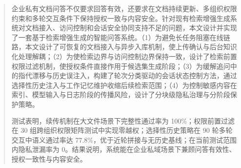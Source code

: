 

\begin{abstract}
  企业私有文档问答不仅要求回答有效，还要求在文档持续更新、多组织权限约束和多轮交互条件下保持授权一致与内容安全。针对现有检索增强生成系统对文档接入、访问控制和会话安全协同支持不足的问题，本文设计并实现了一套基于检索增强生成的智能问答系统。（1）为避免长任务阻塞在线链路，本文设计了可恢复的文档接入与异步入库机制，使上传确认与后台知识化处理解耦；（2）为使检索边界与访问控制边界保持一致，设计了检索前置权限过滤机制，使授权条件直接作用于候选集生成阶段；（3）为缓解追问中的指代漂移与历史误注入，构建了轮次分类驱动的会话状态控制方法，通过选择性历史注入与工作记忆维护收缩后续检索范围；（4）为控制敏感内容在索引、模型输入与日志阶段的传播风险，设计了分块级隐私治理与分阶段保护策略。

  测试表明，续传机制在大文件场景下完整性通过率为 100\%；权限前置过滤在 30 组跨组织权限矩阵测试中实现零越权；选择性历史策略在 90 轮多轮交互中语义通过率达 77.8\%，优于近轮拼接与无历史基线；在当前测试范围内隐私泄漏率为 0。结果说明，系统能在企业私域场景下兼顾问答有效性、授权一致性与内容安全。
\end{abstract}


